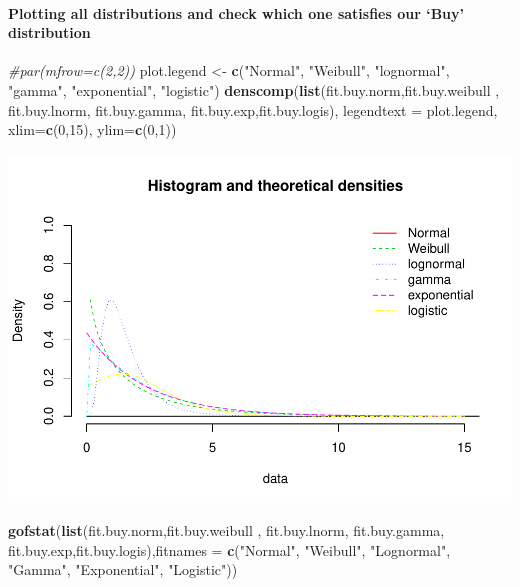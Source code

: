 \documentclass[]{article}
\newenvironment{Shaded}{\begin{snugshade}}{\end{snugshade}}
\newcommand{\KeywordTok}[1]{\textcolor[rgb]{0.13,0.29,0.53}{\textbf{#1}}}
\newcommand{\DataTypeTok}[1]{\textcolor[rgb]{0.13,0.29,0.53}{#1}}
\newcommand{\DecValTok}[1]{\textcolor[rgb]{0.00,0.00,0.81}{#1}}
\newcommand{\StringTok}[1]{\textcolor[rgb]{0.31,0.60,0.02}{#1}}
\newcommand{\CommentTok}[1]{\textcolor[rgb]{0.56,0.35,0.01}{\textit{#1}}}
\newcommand{\NormalTok}[1]{#1}
\let\oldparagraph\paragraph
\renewcommand{\paragraph}[1]{\oldparagraph{#1}\mbox{}}
\begin{document}
\paragraph{\texorpdfstring{Plotting all distributions and check which
one satisfies our `Buy'
distribution}{Plotting all distributions and check which one satisfies our Buy distribution}}\label{plotting-all-distributions-and-check-which-one-satisfies-our-buy-distribution}

\begin{Shaded}
\begin{Highlighting}[]
\CommentTok{#par(mfrow=c(2,2))}
\NormalTok{plot.legend <-}\StringTok{ }\KeywordTok{c}\NormalTok{(}\StringTok{"Normal"}\NormalTok{, }\StringTok{"Weibull"}\NormalTok{, }\StringTok{"lognormal"}\NormalTok{, }\StringTok{"gamma"}\NormalTok{, }\StringTok{"exponential"}\NormalTok{, }\StringTok{"logistic"}\NormalTok{)}
\KeywordTok{denscomp}\NormalTok{(}\KeywordTok{list}\NormalTok{(fit.buy.norm,fit.buy.weibull , fit.buy.lnorm, fit.buy.gamma, fit.buy.exp,fit.buy.logis), }\DataTypeTok{legendtext =}\NormalTok{ plot.legend, }\DataTypeTok{xlim=}\KeywordTok{c}\NormalTok{(}\DecValTok{0}\NormalTok{,}\DecValTok{15}\NormalTok{), }\DataTypeTok{ylim=}\KeywordTok{c}\NormalTok{(}\DecValTok{0}\NormalTok{,}\DecValTok{1}\NormalTok{))}
\end{Highlighting}
\end{Shaded}

\includegraphics{analysis_files/figure-latex/unnamed-chunk-13-1.pdf}

\begin{Shaded}
\begin{Highlighting}[]
\KeywordTok{gofstat}\NormalTok{(}\KeywordTok{list}\NormalTok{(fit.buy.norm,fit.buy.weibull , fit.buy.lnorm, fit.buy.gamma, fit.buy.exp,fit.buy.logis),}\DataTypeTok{fitnames =} \KeywordTok{c}\NormalTok{(}\StringTok{"Normal"}\NormalTok{, }\StringTok{"Weibull"}\NormalTok{, }\StringTok{"Lognormal"}\NormalTok{, }\StringTok{"Gamma"}\NormalTok{, }\StringTok{"Exponential"}\NormalTok{, }\StringTok{"Logistic"}\NormalTok{))}
\end{Highlighting}
\end{Shaded}
\end{document}
